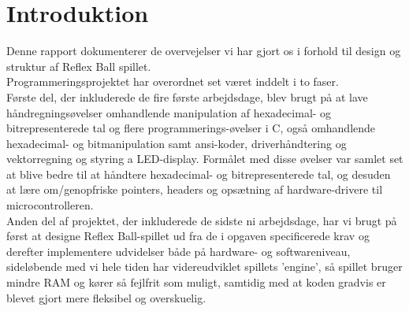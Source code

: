 \chapter{Introduktion}
Denne rapport dokumenterer de overvejelser vi har gjort os i forhold til design og struktur af Reflex Ball spillet. \\
Programmeringsprojektet har overordnet set været inddelt i to faser.\\

Første del, der inkluderede de fire første arbejdsdage, blev brugt på at lave håndregningsøvelser omhandlende manipulation af hexadecimal- og bitrepresenterede tal og flere programmerings-øvelser i C, også omhandlende hexadecimal- og bitmanipulation samt ansi-koder, driverhåndtering og vektorregning og styring a LED-display. Formålet med disse øvelser var samlet set at blive bedre til at håndtere hexadecimal- og bitrepresenterede tal, og desuden at lære om/genopfriske pointers, headers og opsætning af hardware-drivere til microcontrolleren.\\

Anden del af projektet, der inkluderede de sidste ni arbejdsdage, har vi brugt på først at designe Reflex Ball-spillet ud fra de i opgaven specificerede krav og derefter implementere udvidelser både på hardware- og softwareniveau, sideløbende med vi hele tiden har videreudviklet spillets 'engine', så spillet bruger mindre RAM og kører så fejlfrit som muligt, samtidig med at koden gradvis er blevet gjort mere fleksibel og overskuelig.\\
